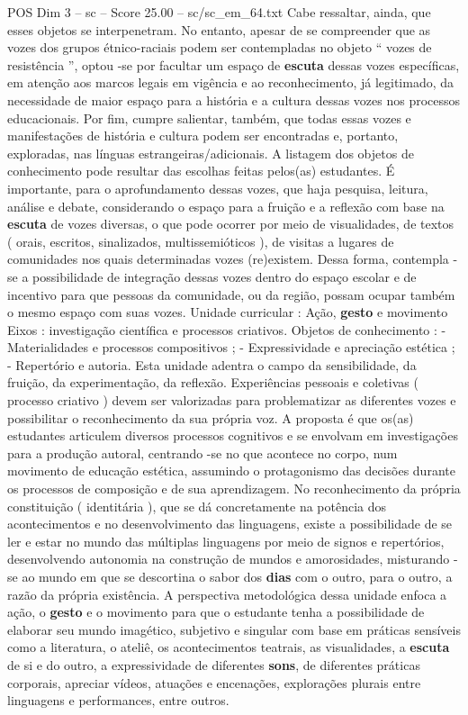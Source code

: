 \begin{textsample}{POS Dim 3 – sc – Score 25.00 – sc/sc\_em\_64.txt}
Cabe ressaltar, ainda, que esses objetos se interpenetram.
No entanto, apesar de se compreender que as vozes dos grupos étnico-raciais podem ser contempladas no objeto “ vozes de resistência ”, optou -se por facultar um espaço de \textbf{escuta} dessas vozes específicas, em atenção aos marcos legais em vigência e ao reconhecimento, já legitimado, da necessidade de maior espaço para a história e a cultura dessas vozes nos processos educacionais.
Por fim, cumpre salientar, também, que todas essas vozes e manifestações de história e cultura podem ser encontradas e, portanto, exploradas, nas línguas estrangeiras/adicionais.
A listagem dos objetos de conhecimento pode resultar das escolhas feitas pelos(as) estudantes.
É importante, para o aprofundamento dessas vozes, que haja pesquisa, leitura, análise e debate, considerando o espaço para a fruição e a reflexão com base na \textbf{escuta} de vozes diversas, o que pode ocorrer por meio de visualidades, de textos ( orais, escritos, sinalizados, multissemióticos ), de visitas a lugares de comunidades nos quais determinadas vozes (re)existem.
Dessa forma, contempla -se a possibilidade de integração dessas vozes dentro do espaço escolar e de incentivo para que pessoas da comunidade, ou da região, possam ocupar também o mesmo espaço com suas vozes.
Unidade curricular : Ação, \textbf{gesto} e movimento Eixos : investigação científica e processos criativos.
Objetos de conhecimento : - Materialidades e processos compositivos ; - Expressividade e apreciação estética ; - Repertório e autoria.
Esta unidade adentra o campo da sensibilidade, da fruição, da experimentação, da reflexão.
Experiências pessoais e coletivas ( processo criativo ) devem ser valorizadas para problematizar as diferentes vozes e possibilitar o reconhecimento da sua própria voz.
A proposta é que os(as) estudantes articulem diversos processos cognitivos e se envolvam em investigações para a produção autoral, centrando -se no que acontece no corpo, num movimento de educação estética, assumindo o protagonismo das decisões durante os processos de composição e de sua aprendizagem.
No reconhecimento da própria constituição ( identitária ), que se dá concretamente na potência dos acontecimentos e no desenvolvimento das linguagens, existe a possibilidade de se ler e estar no mundo das múltiplas linguagens por meio de signos e repertórios, desenvolvendo autonomia na construção de mundos e amorosidades, misturando -se ao mundo em que se descortina o sabor dos \textbf{dias} com o outro, para o outro, a razão da própria existência.
A perspectiva metodológica dessa unidade enfoca a ação, o \textbf{gesto} e o movimento para que o estudante tenha a possibilidade de elaborar seu mundo imagético, subjetivo e singular com base em práticas sensíveis como a literatura, o ateliê, os acontecimentos teatrais, as visualidades, a \textbf{escuta} de si e do outro, a expressividade de diferentes \textbf{sons}, de diferentes práticas corporais, apreciar vídeos, atuações e encenações, explorações plurais entre linguagens e performances, entre outros.

\end{textsample}

